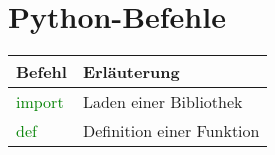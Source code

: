 \documentclass[12pt,a4paper]{scrbook}
\newcommand{\PYTHON}[1]{\textcolor{green}{\ttfamily #1}}
\newenvironment{PythonDef}%
{%
\begin{tabular}{l|l}
    \textbf{Befehl} & \textbf{Erläuterung} \\ \hline 
}%
{%
\end{tabular}%
}
\begin{document}
\chapter{Python-Befehle}

\begin{PythonDef}
 \PYTHON{import} & Laden einer Bibliothek \\ 
 \PYTHON{def}    & Definition einer Funktion \\
\end{PythonDef}
\end{document}
